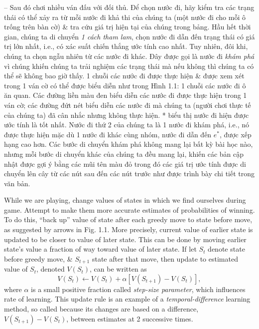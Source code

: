 \documentclass{article}
\begin{document}
\begin{itemize}
\begin{itemize}
        -- Sau đó chơi nhiều ván đấu với đối thủ. Để chọn nước đi, hãy kiểm tra các trạng thái có thể xảy ra từ mỗi nước đi khả thi của chúng ta (một nước đi cho mỗi ô trống trên bàn cờ) \& tra cứu giá trị hiện tại của chúng trong bảng. Hầu hết thời gian, chúng ta di chuyển {\it 1 cách tham lam}, chọn nước đi dẫn đến trạng thái có giá trị lớn nhất, i.e., có xác suất chiến thắng ước tính cao nhất. Tuy nhiên, đôi khi, chúng ta chọn ngẫu nhiên từ các nước đi khác. Đây được gọi là nước đi {\it khám phá} vì chúng khiến chúng ta trải nghiệm các trạng thái mà nếu không thì chúng ta có thể sẽ không bao giờ thấy. 1 chuỗi các nước đi được thực hiện \& được xem xét trong 1 ván cờ có thể được biểu diễn như trong {\sf Hình 1.1: 1 chuỗi các nước đi ô ăn quan. Các đường liền màu đen biểu diễn các nước đi được thực hiện trong 1 ván cờ; các đường đứt nét biểu diễn các nước đi mà chúng ta (người chơi thực tế của chúng ta) đã cân nhắc nhưng không thực hiện. * biểu thị nước đi hiện được ước tính là tốt nhất. Nước đi thứ 2 của chúng ta là 1 nước đi khám phá, i.e., nó được thực hiện mặc dù 1 nước đi khác cùng nhóm, nước đi dẫn đến $e^*$, được xếp hạng cao hơn. Các bước di chuyển khám phá không mang lại bất kỳ bài học nào, nhưng mỗi bước di chuyển khác của chúng ta đều mang lại, khiến các bản cập nhật được gợi ý bằng các mũi tên màu đỏ trong đó các giá trị ước tính được di chuyển lên cây từ các nút sau đến các nút trước như được trình bày chi tiết trong văn bản.}

        While we are playing, change values of states in which we find ourselves during game. Attempt to make them more accurate estimates of probabilities of winning. To do this, ``back up'' value of state after each greedy move to state before move, as suggested by arrows in Fig. 1.1. More precisely, current value of earlier state is updated to be closer to value of later state. This can be done by moving earlier state's value a fraction of way toward value of later state. If let $S_t$ denote state before greedy move, \& $S_{t+1}$ state after that move, then update to estimated value of $S_t$, denoted $V(S_t)$, can be written as
        \begin{equation*}
            V(S_t)\leftarrow V(S_t) + \alpha[V(S_{t+1}) - V(S_t)],
        \end{equation*}
        where $\alpha$ is a small positive fraction called {\it step-size parameter}, which influences rate of learning. This update rule is an example of a {\it temporal-difference} learning method, so called because its changes are based on a difference, $V(S_{t+1}) - V(S_t)$, between estimates at 2 successive times.


\end{itemize}
\end{itemize}
\end{document}

